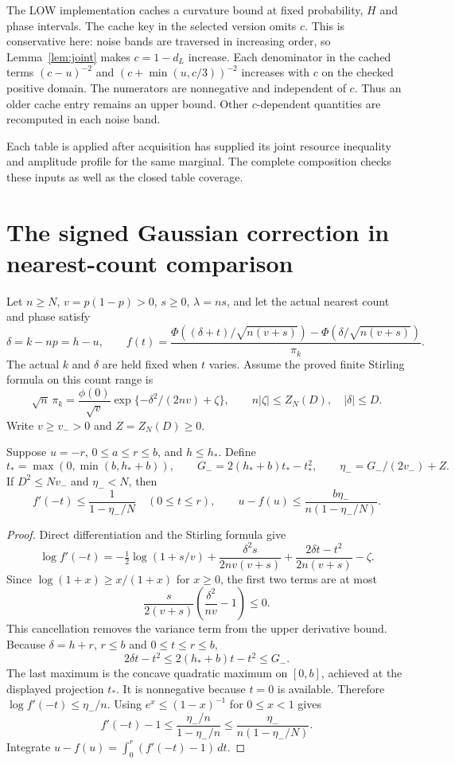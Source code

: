 The LOW implementation caches a curvature bound at fixed probability,
$H$ and phase intervals. The cache key in the selected version omits $c$.
This is conservative here: noise bands are traversed in increasing order,
so Lemma~\ref{lem:joint} makes $c=1-d_L$ increase. Each denominator in the
cached terms $(c-u)^{-2}$ and $(c+\min(u,c/3))^{-2}$ increases with $c$
on the checked positive domain. The numerators are nonnegative and
independent of $c$. Thus an older cache entry remains an upper bound.
Other $c$-dependent quantities are recomputed in each noise band.

Each table is applied after acquisition has supplied its joint resource
inequality and amplitude profile for the same marginal. The complete
composition checks these inputs as well as the closed table coverage.


\section{The signed Gaussian correction in nearest-count comparison}

Let $n\ge N$, $v=p(1-p)>0$, $s\ge0$, $\lambda=ns$, and let the
actual nearest count and phase satisfy
\[
 \delta=k-np=h-u,\qquad
 f(t)=\frac{\Phi((\delta+t)/\sqrt{n(v+s)})-
                   \Phi(\delta/\sqrt{n(v+s)})}{\pi_k}.
\]
The actual $k$ and $\delta$ are held fixed when $t$ varies. Assume the
proved finite Stirling formula on this count range is
\[
 \sqrt n\,\pi_k=\frac{\phi(0)}{\sqrt v}
       \exp\{-\delta^2/(2nv)+\zeta\},\qquad
 n|\zeta|\le Z_N(D),\quad |\delta|\le D.
\]
Write $v\ge v_->0$ and $Z=Z_N(D)\ge0$.

\begin{lemma}
Suppose $u=-r$, $0\le a\le r\le b$, and $h\le h_*$. Define
\[
 t_*=\max(0,\min(b,h_*+b)),\qquad G_-=2(h_*+b)t_*-t_*^2,\qquad
 \eta_-=G_-/(2v_-)+Z.
\]
If $D^2\le Nv_-$ and $\eta_-<N$, then
\[
 f'(-t)\le\frac1{1-\eta_-/N}\quad(0\le t\le r),\qquad
 u-f(u)\le\frac{b\eta_-}{n(1-\eta_-/N)}.
\]
\end{lemma}
\begin{proof}
Direct differentiation and the Stirling formula give
\[
 \log f'(-t)=-\tfrac12\log(1+s/v)
 +\frac{\delta^2s}{2nv(v+s)}
 +\frac{2\delta t-t^2}{2n(v+s)}-\zeta.
\]
Since $\log(1+x)\ge x/(1+x)$ for $x\ge0$, the first two terms are at most
\[
 \frac{s}{2(v+s)}\left(\frac{\delta^2}{nv}-1\right)\le0.
\]
This cancellation removes the variance term from the upper derivative
bound. Because $\delta=h+r$, $r\le b$ and $0\le t\le r\le b$,
\[
 2\delta t-t^2\le 2(h_*+b)t-t^2\le G_-.
\]
The last maximum is the concave quadratic maximum on $[0,b]$, achieved
at the displayed projection $t_*$. It is nonnegative because $t=0$ is
available. Therefore $\log f'(-t)\le\eta_-/n$.
Using $e^x\le(1-x)^{-1}$ for $0\le x<1$ gives
\[
 f'(-t)-1\le\frac{\eta_-/n}{1-\eta_-/n}
             \le\frac{\eta_-}{n(1-\eta_-/N)}.
\]
Integrate $u-f(u)=\int_0^r(f'(-t)-1)\,dt$.
\end{proof}

